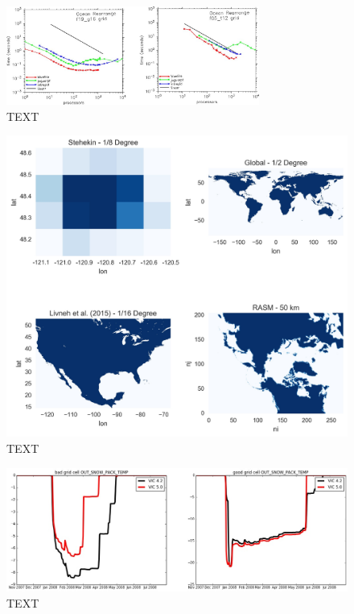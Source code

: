 \documentclass[gmd, manuscript]{copernicus}
\begin{document}
\begin{figure}[t]
\includegraphics[width=8.3cm]{VIC_scaling.jpg}
\caption{TEXT}
\label{fig:vic_scaling}
\end{figure}

\begin{figure}[t]
\includegraphics[width=12cm]{VIC_domains.jpg}
\caption{TEXT}
\label{fig:vic_domain_results}
\end{figure}

\begin{figure}[t]
\includegraphics[width=12cm]{VIC_4v5.jpg}
\caption{TEXT}
\label{fig:vic_4v5}
\end{figure}
\end{document}
